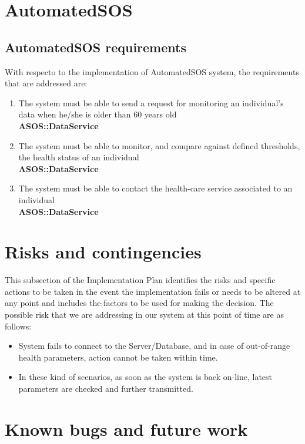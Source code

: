 \documentclass[a4paper, hidelinks, 12pt]{report}
\newcommand\requirement[1]{\item[{[R#1]}] }
\begin{document}
\section{\textbf{AutomatedSOS}}
\subsection{AutomatedSOS requirements}
	With respecto to the implementation of AutomatedSOS system, the requirements that are addressed are:
	\begin{enumerate}
		\requirement{13} The system must be able to send a request for monitoring an individual's data when he/she is older than 60 years old \\
		\textbf{ASOS::DataService}
		\requirement{14} The system must be able to monitor, and compare against defined thresholds, the health status of an individual \\
		\textbf{ASOS::DataService}
		\requirement{15} The system must be able to contact the health-care service associated to an individual \\
		\textbf{ASOS::DataService}
	\end{enumerate}

\section{Risks and contingencies}
This subsection of the Implementation Plan identifies the risks and specific actions to be taken in the event the implementation fails or needs to be altered at any point and includes the factors to be used for making the decision. The possible risk that we are addressing in our system at this point of time are as follows:
\begin{itemize}
\item{} System fails to connect to the Server/Database, and in case of out-of-range health parameters, action cannot be taken within time.
\item{} In these kind of scenarios, as soon as the system is back on-line, latest parameters are checked and further transmitted.
\end{itemize}

\section{Known bugs and future work}
\end{document}
